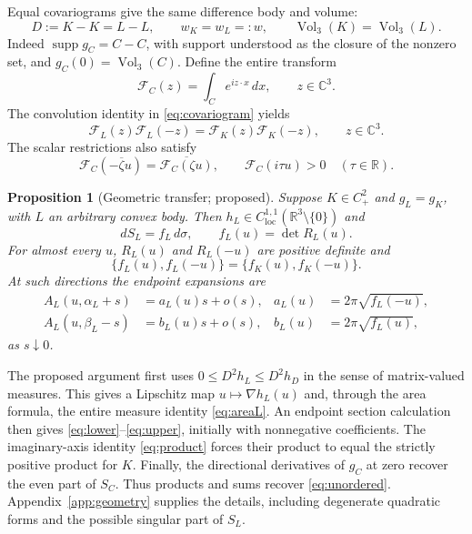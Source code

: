 \documentclass[11pt,a4paper]{article}
\newtheorem{proposition}[theorem]{Proposition}
\theoremstyle{definition}
\theoremstyle{remark}
\newcommand{\R}{\mathbb R}
\newcommand{\C}{\mathbb C}
\newcommand{\vol}{\operatorname{Vol}_3}
\newcommand{\F}{\mathcal F}
\newcommand{\supp}{\operatorname{supp}}
\numberwithin{equation}{section}
\begin{document}
Equal covariograms give the same difference body and volume:
\begin{equation}\label{eq:difference}
 D:=K-K=L-L,\qquad w_K=w_L=:w,\qquad \vol(K)=\vol(L).
\end{equation}
Indeed $\supp g_C=C-C$, with support understood as the closure of the
nonzero set, and $g_C(0)=\vol(C)$.
Define the entire transform
\begin{equation}\label{eq:transform}
 \F_C(z)=\int_C e^{iz\cdot x}\,dx,\qquad z\in\C^3 .
\end{equation}
The convolution identity in \eqref{eq:covariogram} yields
\begin{equation}\label{eq:product}
 \F_L(z)\F_L(-z)=\F_K(z)\F_K(-z),\qquad z\in\C^3.
\end{equation}
The scalar restrictions also satisfy
\begin{equation}\label{eq:reality}
 \F_C(-\overline\zeta u)=\overline{\F_C(\zeta u)},\qquad
 \F_C(i\tau u)>0\quad(\tau\in\R).
\end{equation}

\begin{proposition}[Geometric transfer; proposed]\label{prop:geometric}
Suppose $K\in C^2_+$ and $g_L=g_K$, with $L$ an arbitrary convex body.
Then $h_L\in C^{1,1}_{\mathrm{loc}}(\R^3\setminus\{0\})$ and
\begin{equation}\label{eq:areaL}
 dS_L=f_L\,d\sigma,\qquad f_L(u)=\det R_L(u).
\end{equation}
For almost every $u$, $R_L(u)$ and $R_L(-u)$ are positive definite and
\begin{equation}\label{eq:unordered}
 \{f_L(u),f_L(-u)\}=\{f_K(u),f_K(-u)\}.
\end{equation}
At such directions the endpoint expansions are
\begin{align}
 A_L(u,\alpha_L+s)&=a_L(u)s+o(s),&
 a_L(u)&=2\pi\sqrt{f_L(-u)},\label{eq:lower}\\
 A_L(u,\beta_L-s)&=b_L(u)s+o(s),&
 b_L(u)&=2\pi\sqrt{f_L(u)},\label{eq:upper}
\end{align}
as $s\downarrow0$.
\end{proposition}

The proposed argument first uses $0\le D^2h_L\le D^2h_D$ in the sense
of matrix-valued measures. This gives a Lipschitz map
$u\mapsto\nabla h_L(u)$ and, through the area formula, the entire measure
identity \eqref{eq:areaL}. An endpoint section calculation then gives
\eqref{eq:lower}--\eqref{eq:upper}, initially with nonnegative coefficients.
The imaginary-axis identity \eqref{eq:product} forces their product to
equal the strictly positive product for $K$. Finally, the directional
derivatives of $g_C$ at zero recover the even part of $S_C$.
Thus products and sums recover \eqref{eq:unordered}.
Appendix~\ref{app:geometry} supplies the details, including degenerate
quadratic forms and the possible singular part of $S_L$.
\end{document}
